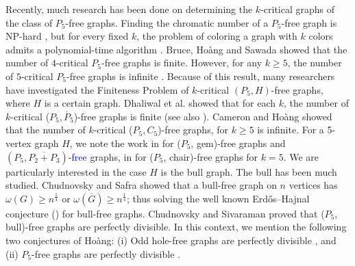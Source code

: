 \documentclass[a4paper,11pt]{article}
\theoremstyle{case}
\begin{document}
Recently, much research has been done on determining the $k$-critical graphs of the class of $P_5$-free graphs.  Finding the chromatic number of a $P_5$-free graph is
NP-hard \cite{KraKra2001}, but for every fixed $k$, the problem of coloring a graph with $k$ colors admits a polynomial-time
algorithm \cite{HoaKam2008, HoaKam2010}. Bruce, Ho\`ang and Sawada \cite{BruHoa2009} showed that the number of $4$-critical $P_5$-free graphs is finite. However, for any $k \geq 5$, the number of $5$-critical $P_5$-free graphs is infinite \cite{HoaMoo2015, HoaMoo2013}. Because of this result, many researchers have investigated the Finiteness Problem of $k$-critical $(P_5, H)$-free graphs, where $H$ is a certain graph. Dhaliwal et al.  \cite{DhaHam2017} showed that for each $k$, the number of $k$-critical ($P_5, \overline{P}_5$)-free graphs is finite (see also \cite{HoaLaz2015}). Cameron and Ho\`ang \cite{CamHoa2024} showed that the number of $k$-critical ($P_5, C_5$)-free graphs, for $k \geq 5$ is infinite. For a 5-vertex graph $H$, we note the work in \cite{CaiGoe2023} for ($P_5$, gem)-free graphs and $(P_5, \overline{P_2 + P_3})$-\textcolor{blue}{free} graphs, in \cite{HuaLi2023} for ($P_5$, chair)-free graphs for $k=5$. We are particularly interested in the case $H$ is the bull graph.  The bull has been much studied. Chudnovsky and Safra \cite{ChuSaf2008} showed that a bull-free graph on $n$ vertices has $\omega(G) \geq n^{\frac{1}{4}}$ or $\omega(\overline{G}) \geq n^{\frac{1}{4}}$; thus solving the well known Erd\H os–Hajnal conjecture (\cite{ErdHaj1989}) for bull-free graphs. Chudnovsky and Sivaraman \cite{ChuSiv2019} proved that ($P_5$, bull)-free graphs are perfectly divisible. In this context, we mention the following two conjectures of Ho\`ang: (i) Odd hole-free graphs are perfectly divisible \cite{Hoa2026}, and (ii) $P_5$-free graphs are perfectly divisible \cite{Hoa2018}. 
\end{document}
